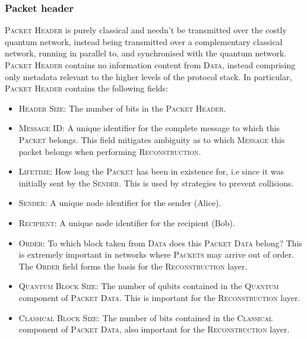 \documentclass[aps, rmp, twocolumn, amsmath, amssymb, nofootinbib, superscriptaddress, longbibliography, floatfix, table-of-contents, eqsecnum]{revtex4-1}
\begin{document}
%
%

\subsubsection{Packet header} \label{sec:packet_header} 

\textsc{Packet Header} is purely classical and needn't be transmitted over the costly quantum network, instead being transmitted over a complementary classical network, running in parallel to, and synchronised with the quantum network. \textsc{Packet Header} contains no information content from \textsc{Data}, instead comprising only metadata relevant to the higher levels of the protocol stack. In particular, \textsc{Packet Header} contains the following fields:
\begin{itemize}
    \item \textsc{Header Size}: The number of bits in the \textsc{Packet Header}.
    \item \textsc{Message ID}: A unique identifier for the complete message to which this \textsc{Packet} belongs. This field mitigates ambiguity as to which \textsc{Message} this packet belongs when performing \textsc{Reconstruction}.
    \item \textsc{Lifetime}: How long the \textsc{Packet} has been in existence for, i.e since it was initially sent by the \textsc{Sender}. This is used by strategies to prevent collisions.
    \item \textsc{Sender}: A unique node identifier for the sender (Alice).
    \item \textsc{Recipient}: A unique node identifier for the recipient (Bob).
    \item \textsc{Order}: To which block taken from \textsc{Data} does this \textsc{Packet Data} belong? This is extremely important in networks where \textsc{Packets} may arrive out of order. The \textsc{Order} field forms the basis for the \textsc{Reconstruction} layer.
    \item \textsc{Quantum Block Size}: The number of qubits contained in the \textsc{Quantum} component of \textsc{Packet Data}. This is important for the \textsc{Reconstruction} layer.
    \item \textsc{Classical Block Size}: The number of bits contained in the \textsc{Classical} component of \textsc{Packet Data}, also important for the \textsc{Reconstruction} layer.

\end{itemize}
\end{document}
